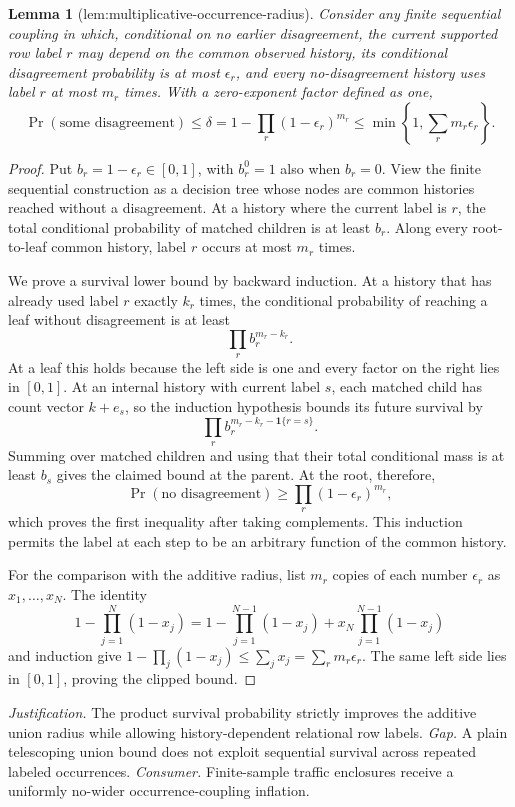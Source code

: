 \documentclass{article}
\newtheorem{lemma}{Lemma}
\begin{document}
\begin{lemma}[lem:multiplicative-occurrence-radius]\label{lem:multiplicative-occurrence-radius}
Consider any finite sequential coupling in which, conditional on no earlier disagreement, the current supported row label \(r\) may depend on the common observed history, its conditional disagreement probability is at most \(\epsilon_r\), and every no-disagreement history uses label \(r\) at most \(m_r\) times.  With a zero-exponent factor defined as one,
\[
 \Pr(\text{some disagreement})\leq
 \delta=1-\prod_r(1-\epsilon_r)^{m_r}
 \leq\min\left\{1,\sum_r m_r\epsilon_r\right\}.
\]
\end{lemma}
\begin{proof}
Put \(b_r=1-\epsilon_r\in[0,1]\), with \(b_r^0=1\) also when \(b_r=0\).  View the finite sequential construction as a decision tree whose nodes are common histories reached without a disagreement.  At a history where the current label is \(r\), the total conditional probability of matched children is at least \(b_r\).  Along every root-to-leaf common history, label \(r\) occurs at most \(m_r\) times.

We prove a survival lower bound by backward induction.  At a history that has already used label \(r\) exactly \(k_r\) times, the conditional probability of reaching a leaf without disagreement is at least
\[
 \prod_r b_r^{m_r-k_r}.
\]
At a leaf this holds because the left side is one and every factor on the right lies in \([0,1]\).  At an internal history with current label \(s\), each matched child has count vector \(k+e_s\), so the induction hypothesis bounds its future survival by
\[
 \prod_r b_r^{m_r-k_r-\mathbf 1\{r=s\}}.
\]
Summing over matched children and using that their total conditional mass is at least \(b_s\) gives the claimed bound at the parent.  At the root, therefore,
\[
 \Pr(\text{no disagreement})\geq\prod_r(1-\epsilon_r)^{m_r},
\]
which proves the first inequality after taking complements.  This induction permits the label at each step to be an arbitrary function of the common history.

For the comparison with the additive radius, list \(m_r\) copies of each number \(\epsilon_r\) as \(x_1,\ldots,x_N\).  The identity
\[
 1-\prod_{j=1}^N(1-x_j)
 =1-\prod_{j=1}^{N-1}(1-x_j)+x_N\prod_{j=1}^{N-1}(1-x_j)
\]
and induction give \(1-\prod_j(1-x_j)\leq\sum_jx_j=\sum_rm_r\epsilon_r\).  The same left side lies in \([0,1]\), proving the clipped bound.
\end{proof}
\par\smallskip\noindent \textit{Justification.} The product survival probability strictly improves the additive union radius while allowing history-dependent relational row labels. \textit{Gap.} A plain telescoping union bound does not exploit sequential survival across repeated labeled occurrences. \textit{Consumer.} Finite-sample traffic enclosures receive a uniformly no-wider occurrence-coupling inflation.
\end{document}
